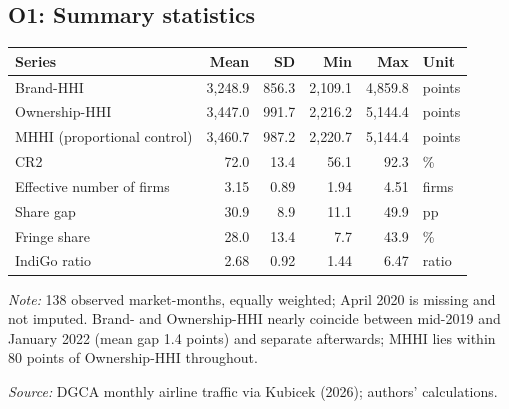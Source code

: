 \documentclass[12pt,a4paper]{article}
\newif\ifoneon
\newcommand{\oneHL}{\par\oneontrue\color{orange}\captionsetup{font+={color=blue}}}
\begin{document}
\clearpage
{\oneHL \subsection{O1: Summary statistics}
\label{app:o1-tables}
\begin{minipage}{\linewidth}
\label{tab:o1-summary}
\centering
{\small{}\setlength{\tabcolsep}{5pt}
\begin{tabular}{@{}lrrrrl@{}}
\toprule
Series & Mean & SD & Min & Max & Unit \\
\midrule
Brand-HHI & 3{,}248.9 & 856.3 & 2{,}109.1 & 4{,}859.8 & points \\
Ownership-HHI & 3{,}447.0 & 991.7 & 2{,}216.2 & 5{,}144.4 & points \\
MHHI (proportional control) & 3{,}460.7 & 987.2 & 2{,}220.7 & 5{,}144.4 & points \\
CR2 & 72.0 & 13.4 & 56.1 & 92.3 & \% \\
Effective number of firms & 3.15 & 0.89 & 1.94 & 4.51 & firms \\
Share gap & 30.9 & 8.9 & 11.1 & 49.9 & pp \\
Fringe share & 28.0 & 13.4 & 7.7 & 43.9 & \% \\
IndiGo ratio & 2.68 & 0.92 & 1.44 & 6.47 & ratio \\
\bottomrule
\end{tabular}\par}
\vspace{4pt}
{\footnotesize{}\raggedright\textit{Note:} 138 observed market-months, equally weighted; April 2020 is missing and not imputed. Brand- and Ownership-HHI nearly coincide between mid-2019 and January 2022 (mean gap 1.4 points) and separate afterwards; MHHI lies within 80 points of Ownership-HHI throughout.\par
\textit{Source:} DGCA monthly airline traffic via Kubicek (2026); authors' calculations.\par}
\end{minipage}
\par}



\clearpage
\end{document}
